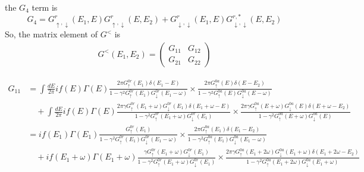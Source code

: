 \documentclass[11pt,a4paper]{article}
\begin{document}
the $G_{4}$ term is
\begin{equation}
G_{4} =  G_{\uparrow, \downarrow}^{r}(E_{1},E)G_{\uparrow, \downarrow}^{r}(E, E_{2}) + G_{\downarrow, \downarrow}^{r}(E_{1},E)G_{\downarrow, \downarrow}^{r,*}(E,E_{2})  
\end{equation}
So, the matrix element of $G^{<}$ is
\begin{equation}
\begin{split}
G^{<}\left(E_{1}, E_{2}\right) =
\left(\begin{array}{cc}
G_{11} & G_{12} \\
G_{21} & G_{22}
\end{array}\right)
\end{split}
\end{equation}

\begin{equation}
\begin{split}
G_{11}&=\int \frac{d E}{2 \pi} i f(E) \Gamma(E) \frac{2 \pi G_{ \uparrow}^{0r}\left(E_{1}\right) \delta\left(E_{1}-E\right)}{1-\gamma^{2} G_{ \uparrow}^{0r}\left(E_{1}\right) G_{ \downarrow}^{0r}\left(E_{1}-\omega\right)} \times 
\frac{2 \pi G_{ \uparrow}^{0a}\left(E\right) \delta\left(E-E_{2}\right)} {1-\gamma^{2} G_{ \uparrow}^{0a}\left(E\right) G_{ \downarrow}^{0a}\left(E-\omega\right)} \\
&\quad+ \int \frac{d E}{2 \pi} i f(E) \Gamma(E) \frac{2 \pi\gamma G_{ \uparrow}^{0r}\left(E_{1}+\omega\right) G_{ \downarrow}^{0r} \left(E_{1}\right) \delta(E_{1}+\omega-E) }{1-\gamma^{2} G_{ \uparrow}^{0r}\left(E_{1}+\omega\right) G_{ \downarrow}^{0r}\left(E_{1}\right)} \times
\frac{2 \pi\gamma G_{ \uparrow}^{0a}\left(E+\omega\right) G_{ \downarrow}^{0a} \left(E\right) \delta(E+\omega-E_{2}) }{1-\gamma^{2} G_{ \uparrow}^{0a}\left(E+\omega\right) G_{ \downarrow}^{0a}\left(E\right)} \\
&= i f(E_{1}) \Gamma(E_{1}) \frac{ G_{ \uparrow}^{0r}\left(E_{1}\right) }{1-\gamma^{2} G_{ \uparrow}^{0r}\left(E_{1}\right) G_{ \downarrow}^{0r}\left(E_{1}-\omega\right)} \times 
\frac{2 \pi G_{ \uparrow}^{0a}\left(E_{1}\right) \delta\left(E_{1}-E_{2}\right)} {1-\gamma^{2} G_{ \uparrow}^{0a}\left(E_{1}\right) G_{ \downarrow}^{0a}\left(E_{1}-\omega\right)} \\
&\quad+ i f(E_{1}+\omega) \Gamma(E_{1}+\omega) \frac{\gamma G_{ \uparrow}^{0r}\left(E_{1}+\omega\right) G_{ \downarrow}^{0r} \left(E_{1}\right)  }{1-\gamma^{2} G_{ \uparrow}^{0r}\left(E_{1}+\omega\right) G_{ \downarrow}^{0r}\left(E_{1}\right)} \times
\frac{2 \pi\gamma G_{ \uparrow}^{0a}\left(E_{1}+2\omega\right) G_{ \downarrow}^{0a} \left(E_{1}+\omega\right) \delta(E_{1}+2\omega-E_{2}) }{1-\gamma^{2} G_{ \uparrow}^{0a}\left(E_{1}+2\omega\right) G_{ \downarrow}^{0a}\left(E_{1}+\omega\right)}
\end{split}
\end{equation}
\end{document}
